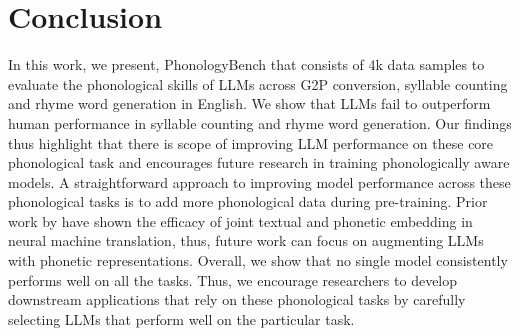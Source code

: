 \section{Conclusion}
In this work, we present, PhonologyBench that consists of 4k data samples to evaluate the phonological skills of LLMs across G2P conversion, syllable counting and rhyme word generation in English. We show that LLMs fail to outperform human performance in syllable counting and rhyme word generation. Our findings thus highlight that there is scope of improving LLM performance on these core phonological task and encourages future research in training phonologically aware models. A straightforward approach to improving model performance across these phonological tasks is to add more phonological data during pre-training. Prior work by \citet{liu-etal-2019-robust} have shown the efficacy of joint textual and phonetic embedding in neural machine translation, thus, future work can focus on augmenting LLMs with phonetic representations. Overall, we show that no single model consistently performs well on all the tasks. Thus, we encourage researchers to develop downstream applications that rely on these phonological tasks by carefully selecting LLMs that perform well on the particular task. 


